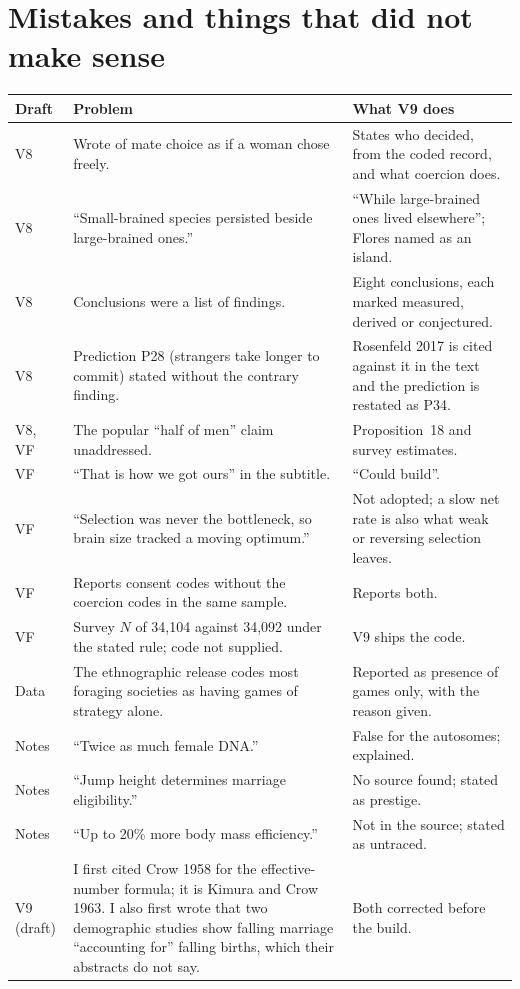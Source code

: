 \documentclass[10pt,letterpaper]{extarticle}
\begin{document}
\section{Mistakes and things that did not make sense}

{\small
\begin{longtable}{@{}P{0.07\textwidth}P{0.45\textwidth}P{0.42\textwidth}@{}}
\toprule
Draft & Problem & What V9 does\\
\midrule
\endhead
V8 & Wrote of mate choice as if a woman chose freely. & States who decided, from the coded record, and what coercion does.\\
V8 & ``Small-brained species persisted beside large-brained ones.'' & ``While large-brained ones lived elsewhere''; Flores named as an island.\\
V8 & Conclusions were a list of findings. & Eight conclusions, each marked measured, derived or conjectured.\\
V8 & Prediction P28 (strangers take longer to commit) stated without the contrary finding. & Rosenfeld 2017 is cited against it in the text and the prediction is restated as P34.\\
V8, VF & The popular ``half of men'' claim unaddressed. & Proposition~18 and survey estimates.\\
VF & ``That is how we got ours'' in the subtitle. & ``Could build''.\\
VF & ``Selection was never the bottleneck, so brain size tracked a moving optimum.'' & Not adopted; a slow net rate is also what weak or reversing selection leaves.\\
VF & Reports consent codes without the coercion codes in the same sample. & Reports both.\\
VF & Survey $N$ of 34{,}104 against 34{,}092 under the stated rule; code not supplied. & V9 ships the code.\\
Data & The ethnographic release codes most foraging societies as having games of strategy alone. & Reported as presence of games only, with the reason given.\\
Notes & ``Twice as much female DNA.'' & False for the autosomes; explained.\\
Notes & ``Jump height determines marriage eligibility.'' & No source found; stated as prestige.\\
Notes & ``Up to 20\% more body mass efficiency.'' & Not in the source; stated as untraced.\\
V9 (draft) & I first cited Crow 1958 for the effective-number formula; it is Kimura and Crow 1963. I also first wrote that two demographic studies show falling marriage ``accounting for'' falling births, which their abstracts do not say. & Both corrected before the build.\\
\bottomrule
\end{longtable}}
\end{document}

